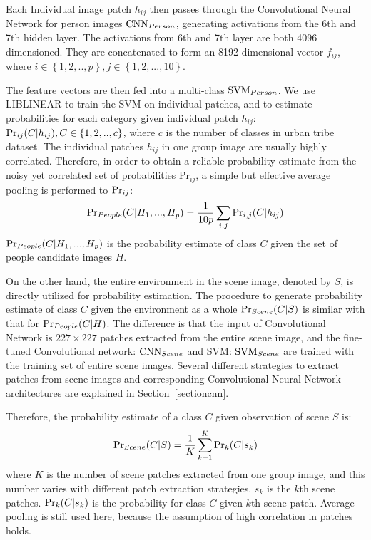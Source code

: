 \documentclass[10pt,twocolumn,letterpaper]{article}
\begin{document}
Each Individual image patch $h_{ij}$ then passes through the Convolutional Neural Network for person images $\textup{CNN}_{Person}$, generating activations from the 6th and 7th hidden layer. The activations from 6th and 7th layer are both 4096 dimensioned. They are concatenated to form an 8192-dimensional vector $f_{ij}$, where $i \in \left\{1,2,..,p\right\}, j\in \left\{1,2,...,10\right\}$. 

The feature vectors are then fed into a multi-class $\textup{SVM}_{Person}$. We use LIBLINEAR\cite{liblinear} to train the SVM on individual patches, and to estimate probabilities for each category given individual patch $h_{ij}$: $\textup{Pr}_{ij}(C|h_{ij}), C \in \left\{1,2,..,c\right\}$, where $c$ is the number of classes in urban tribe dataset. The individual patches $h_{ij}$ in one group image are usually highly correlated. Therefore, in order to obtain a reliable probability estimate from the noisy yet correlated set of probabilities $\text{Pr}_{ij}$, a simple but effective average pooling is performed to $\textup{Pr}_{ij}$:
\begin{equation}
\textup{Pr}_{People}(C|H_{1}, ..., H_{p})=\frac{1}{10p}\sum_{i,j}\textup{Pr}_{i,j}(C|h_{ij})
\end{equation}
$\textup{Pr}_{People}(C|H_{1}, ..., H_{p})$ is the probability estimate of class $C$ given the set of people candidate images $H$. 

On the other hand, the entire environment in the scene image, denoted by $S$,  is directly utilized for probability estimation. The procedure to generate probability estimate of class $C$ given the environment as a whole $\textup{Pr}_{Scene}(C|S)$ is similar with that for $\textup{Pr}_{People}(C|H)$. The difference is that the input of Convolutional Network is $227\times227$ patches extracted from the entire scene image, and the fine-tuned Convolutional network: $\textup{CNN}_{Scene}$ and SVM: $\textup{SVM}_{Scene}$ are trained with the training set of entire scene images. Several different strategies to extract patches from scene images and corresponding Convolutional Neural Network architectures are explained in Section~\ref{sectioncnn}.

Therefore, the probability estimate of a class $C$ given observation of scene $S$ is:
\begin{equation}
\textup{Pr}_{Scene}(C|S)=\frac{1}{K}\sum_{k=1}^{K}\textup{Pr}_{k}(C|s_{k})
\end{equation}
where $K$ is the number of scene patches extracted from one group image, and this number varies with different patch extraction strategies. $s_{k}$ is the $k$th scene patches. $\textup{Pr}_{k}(C|s_{k})$ is the probability for class $C$ given $k$th scene patch. Average pooling is still used here, because the assumption of high correlation in patches holds. 
\end{document}
